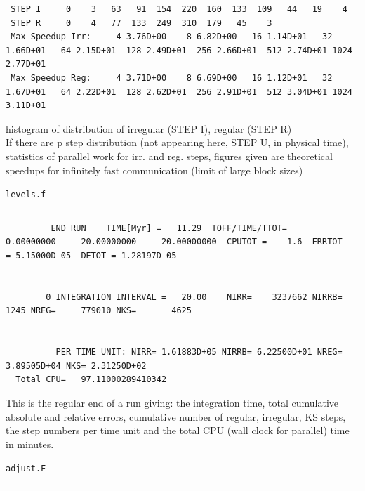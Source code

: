 \begin{landscape}
\vspace{1ex}
\noindent
\begin{minipage}[t]{18cm}
{\tiny
\begin{verbatim}
 STEP I     0    3   63   91  154  220  160  133  109   44   19    4
 STEP R     0    4   77  133  249  310  179   45    3
 Max Speedup Irr:     4 3.76D+00    8 6.82D+00   16 1.14D+01   32 1.66D+01   64 2.15D+01  128 2.49D+01  256 2.66D+01  512 2.74D+01 1024 2.77D+01
 Max Speedup Reg:     4 3.71D+00    8 6.69D+00   16 1.12D+01   32 1.67D+01   64 2.22D+01  128 2.62D+01  256 2.91D+01  512 3.04D+01 1024 3.11D+01
\end{verbatim}
}
histogram of distribution of irregular (STEP I), regular (STEP R)\\
If there are p step distribution (not appearing here, STEP U,
in physical time), statistics of parallel work for irr. and reg.
steps, figures given are theoretical speedups for infinitely
fast communication (limit of large block sizes)
\end{minipage} \hfill
%
\begin{minipage}{4.5cm}
\begin{center}
{\tt levels.f}
\end{center}
\end{minipage}

\vspace{2ex}
\noindent
\hrule



\vspace{1ex}
\noindent
\begin{minipage}[c]{18cm}
{\tiny
\begin{verbatim}
         END RUN    TIME[Myr] =   11.29  TOFF/TIME/TTOT=      0.00000000     20.00000000     20.00000000  CPUTOT =    1.6  ERRTOT =-5.15000D-05  DETOT =-1.28197D-05


        0 INTEGRATION INTERVAL =   20.00    NIRR=    3237662 NIRRB=       1245 NREG=     779010 NKS=       4625


          PER TIME UNIT: NIRR= 1.61883D+05 NIRRB= 6.22500D+01 NREG= 3.89505D+04 NKS= 2.31250D+02
  Total CPU=   97.11000289410342     
\end{verbatim}
}
This is the regular end of a run giving:
the integration time, total cumulative absolute and relative errors,
cumulative number of regular, irregular, KS steps,
the step numbers per time unit and the total CPU
(wall clock for parallel) time in minutes.\\
\end{minipage} \hfill
%
\begin{minipage}{4.5cm}
\begin{center}
\vspace{1cm}
{\tt adjust.F}
\end{center}
\end{minipage}


\noindent
\hrule
\vfill
\end{landscape}

